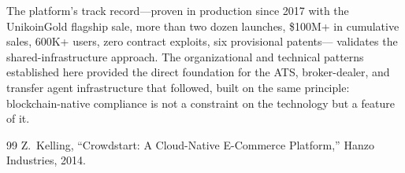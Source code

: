 \documentclass[11pt,letterpaper]{article}
\begin{document}
The platform's track record---proven in production since 2017 with the
UnikoinGold flagship sale, more than two dozen launches, \$100M+ in cumulative
sales, 600K+ users, zero contract exploits, six provisional patents---
validates the shared-infrastructure approach. The organizational and technical
patterns established here provided the direct foundation for the ATS,
broker-dealer, and transfer agent infrastructure that followed, built on the
same principle: blockchain-native compliance is not a constraint on the
technology but a feature of it.

\begin{thebibliography}{99}
 Z.~Kelling, ``Crowdstart: A Cloud-Native E-Commerce
Platform,'' Hanzo Industries, 2014.
\end{thebibliography}
\end{document}
